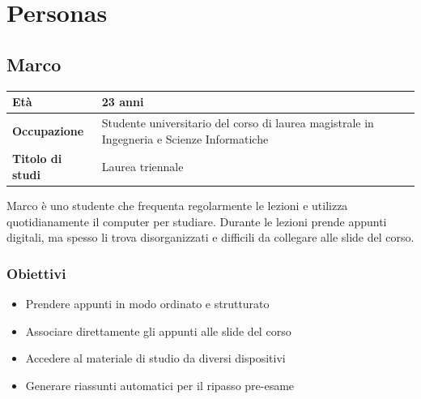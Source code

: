 \section{Personas}

\subsection{Marco}
\begin{table}[h]
\centering
\begin{tabular}{|l|p{10cm}|}
\hline
\textbf{Età} & 23 anni \\
\hline
\textbf{Occupazione} & Studente universitario del corso di laurea magistrale in Ingegneria e Scienze Informatiche \\
\hline
\textbf{Titolo di studi} & Laurea triennale \\
\hline
\end{tabular}
\end{table}
Marco è uno studente che frequenta regolarmente le lezioni e utilizza quotidianamente il computer per studiare. Durante le lezioni prende appunti digitali, ma spesso li trova disorganizzati e difficili da collegare alle slide del corso.

\subsubsection{Obiettivi}
\begin{itemize}
    \item Prendere appunti in modo ordinato e strutturato
    \item Associare direttamente gli appunti alle slide del corso
    \item Accedere al materiale di studio da diversi dispositivi
    \item Generare riassunti automatici per il ripasso pre-esame
\end{itemize}

